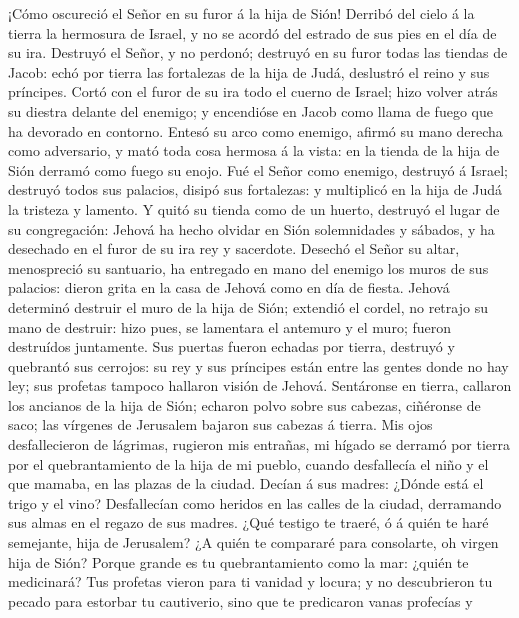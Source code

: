  ¡Cómo oscureció el Señor en su furor á la hija de Sión!
Derribó del cielo á la tierra la hermosura de Israel, y no se acordó del
estrado de sus pies en el día de su ira.  Destruyó el
Señor, y no perdonó; destruyó en su furor todas las tiendas de Jacob:
echó por tierra las fortalezas de la hija de Judá, deslustró el reino y
sus príncipes.  Cortó con el furor de su ira todo el
cuerno de Israel; hizo volver atrás su diestra delante del enemigo; y
encendióse en Jacob como llama de fuego que ha devorado en contorno.
 Entesó su arco como enemigo, afirmó su mano derecha como
adversario, y mató toda cosa hermosa á la vista: en la tienda de la hija
de Sión derramó como fuego su enojo.  Fué el Señor como
enemigo, destruyó á Israel; destruyó todos sus palacios, disipó sus
fortalezas: y multiplicó en la hija de Judá la tristeza y lamento.
 Y quitó su tienda como de un huerto, destruyó el lugar de
su congregación: Jehová ha hecho olvidar en Sión solemnidades y sábados,
y ha desechado en el furor de su ira rey y sacerdote. 
Desechó el Señor su altar, menospreció su santuario, ha entregado en
mano del enemigo los muros de sus palacios: dieron grita en la casa de
Jehová como en día de fiesta.  Jehová determinó destruir
el muro de la hija de Sión; extendió el cordel, no retrajo su mano de
destruir: hizo pues, se lamentara el antemuro y el muro; fueron
destruídos juntamente.  Sus puertas fueron echadas por
tierra, destruyó y quebrantó sus cerrojos: su rey y sus príncipes están
entre las gentes donde no hay ley; sus profetas tampoco hallaron visión
de Jehová.  Sentáronse en tierra, callaron los ancianos
de la hija de Sión; echaron polvo sobre sus cabezas, ciñéronse de saco;
las vírgenes de Jerusalem bajaron sus cabezas á tierra. 
Mis ojos desfallecieron de lágrimas, rugieron mis entrañas, mi hígado se
derramó por tierra por el quebrantamiento de la hija de mi pueblo,
cuando desfallecía el niño y el que mamaba, en las plazas de la ciudad.
 Decían á sus madres: ¿Dónde está el trigo y el vino?
Desfallecían como heridos en las calles de la ciudad, derramando sus
almas en el regazo de sus madres.  ¿Qué testigo te
traeré, ó á quién te haré semejante, hija de Jerusalem? ¿A quién te
compararé para consolarte, oh virgen hija de Sión? Porque grande es tu
quebrantamiento como la mar: ¿quién te medicinará?  Tus
profetas vieron para ti vanidad y locura; y no descubrieron tu pecado
para estorbar tu cautiverio, sino que te predicaron vanas profecías y
